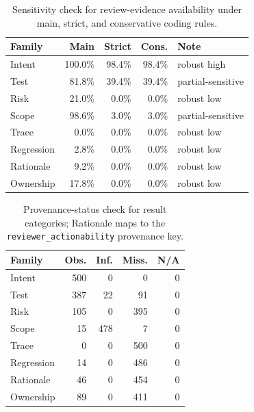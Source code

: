 \documentclass[10pt,conference]{IEEEtran}
\begin{document}
\begin{table}[t]
\centering
\caption{Sensitivity check for review-evidence availability under main, strict, and conservative coding rules.}
\label{tab:availability-sensitivity-compact}
\footnotesize
\begin{tabular}{@{}L{0.25\columnwidth}rrrL{0.23\columnwidth}@{}}
\toprule
Family & Main & Strict & Cons. & Note \\
\midrule
Intent & 100.0\% & 98.4\% & 98.4\% & robust high \\
Test & 81.8\% & 39.4\% & 39.4\% & partial-sensitive \\
Risk & 21.0\% & 0.0\% & 0.0\% & robust low \\
Scope & 98.6\% & 3.0\% & 3.0\% & partial-sensitive \\
Trace & 0.0\% & 0.0\% & 0.0\% & robust low \\
Regression & 2.8\% & 0.0\% & 0.0\% & robust low \\
Rationale & 9.2\% & 0.0\% & 0.0\% & robust low \\
Ownership & 17.8\% & 0.0\% & 0.0\% & robust low \\
\bottomrule
\end{tabular}
\end{table}

\begin{table}[t]
\centering
\caption{Provenance-status check for result categories; Rationale maps to the \texttt{reviewer\_actionability} provenance key.}
\label{tab:provenance-compact}
\footnotesize
\begin{tabular}{@{}L{0.28\columnwidth}rrrr@{}}
\toprule
Family & Obs. & Inf. & Miss. & N/A \\
\midrule
Intent & 500 & 0 & 0 & 0 \\
Test & 387 & 22 & 91 & 0 \\
Risk & 105 & 0 & 395 & 0 \\
Scope & 15 & 478 & 7 & 0 \\
Trace & 0 & 0 & 500 & 0 \\
Regression & 14 & 0 & 486 & 0 \\
Rationale & 46 & 0 & 454 & 0 \\
Ownership & 89 & 0 & 411 & 0 \\
\bottomrule
\end{tabular}
\end{table}
\end{document}
